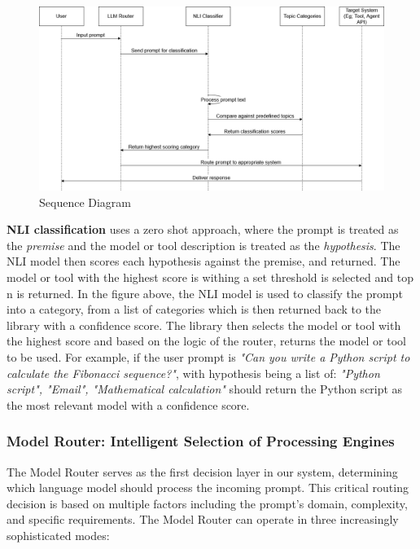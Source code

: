 \begin{figure}[H]
    \centering
    \includegraphics[width=1\textwidth]{figures/seq-digram.drawio.png}
    \caption{Sequence Diagram}
    \label{fig:seq_diagram}
\end{figure}


\textbf{NLI classification} uses a zero shot approach, where the prompt is treated as the \textit{premise} and the model or tool description is treated as the \textit{hypothesis}. The NLI model then scores each hypothesis against the premise, and returned. The model or tool with the highest score is withing a set threshold is selected and top n is returned.
\newline
In the figure above, the NLI model is used to classify the prompt into a category, from a list of categories which is then returned back to the library with a confidence score. The library then selects the model or tool with the highest score and based on the logic of the router, returns the model or tool to be used.
\newline
For example, if the user prompt is \textit{"Can you write a Python script to calculate the Fibonacci sequence?"}, with hypothesis being a list of: \textit{"Python script", "Email", "Mathematical calculation"} should return the Python script as the most relevant model with a confidence score.




\subsubsection{Model Router: Intelligent Selection of Processing Engines}

The Model Router serves as the first decision layer in our system, determining which language model should process the incoming prompt. This critical routing decision is based on multiple factors including the prompt's domain, complexity, and specific requirements. The Model Router can operate in three increasingly sophisticated modes:


